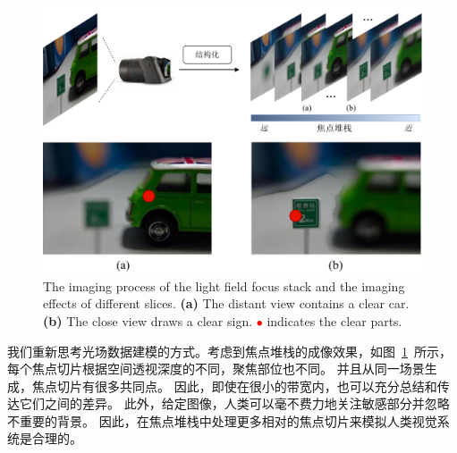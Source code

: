 \begin{figure}[ht]
	\centering
	\includegraphics[width=0.85\linewidth]{figures/chapter3/cpt3_idea.pdf}
	{ %
		The imaging process of the light field focus stack and the imaging effects of different slices.
		\textbf{(a)} The distant view contains a clear car.
		\textbf{(b)} The close view draws a clear sign.
		\textcolor{red}{$\bullet$} indicates the clear parts.  
	}
	\label{figure:cpt3:idea}
	
\end{figure}
%
%
%
%
我们重新思考光场数据建模的方式。考虑到焦点堆栈的成像效果，如图~\ref{figure:cpt3:idea}~所示，每个焦点切片根据空间透视深度的不同，聚焦部位也不同。 并且从同一场景生成，焦点切片有很多共同点。
因此，即使在很小的带宽内，也可以充分总结和传达它们之间的差异。 此外，给定图像，人类可以毫不费力地关注敏感部分并忽略不重要的背景。 因此，在焦点堆栈中处理更多相对的焦点切片来模拟人类视觉系统是合理的。 
%
%
%
%
\par
%
%

